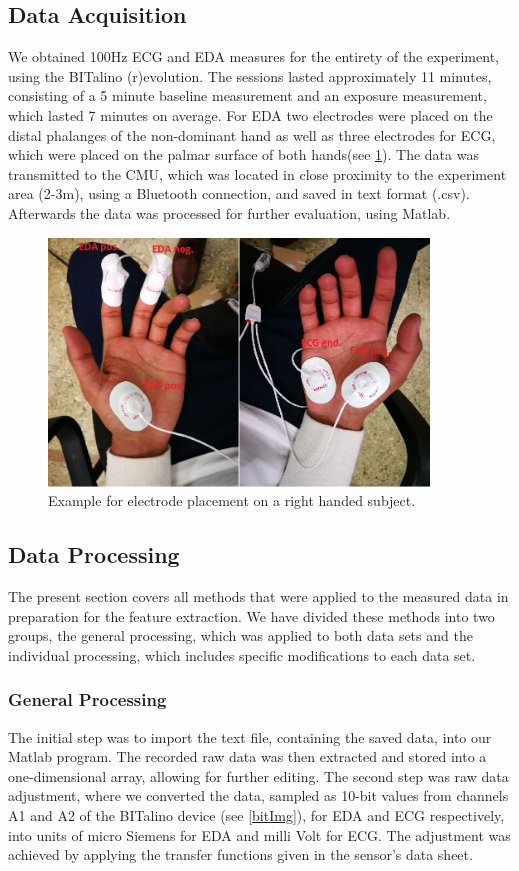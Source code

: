 \subsection{Data Acquisition}
We obtained 100Hz ECG and EDA measures for the entirety of the experiment, using the BITalino (r)evolution. The sessions lasted approximately 11 minutes, consisting of a 5 minute baseline measurement and an exposure measurement, which lasted 7 minutes on average. For EDA two electrodes were placed on the distal phalanges of the non-dominant hand as well as three electrodes for ECG, which were placed on the palmar surface of both hands(see \ref{epImg}). The data was transmitted to the CMU, which was located in close proximity to the experiment area (2-3m), using a Bluetooth connection, and saved in text format (.csv). Afterwards the data was processed for further evaluation, using Matlab.

\begin{figure}[H]
\centering
\includegraphics[width=0.9\textwidth]{images/ep.png}
\caption{Example for electrode placement on a right handed subject.}
\label{epImg}
\end{figure}

\subsection{Data Processing}
The present section covers all methods that were applied to the measured data in preparation for the feature extraction. We have divided these methods into two groups, the general processing, which was applied to both data sets and the individual processing, which includes specific modifications to each data set.

\subsubsection{General Processing}\label{generalproc}
The initial step was to import the text file, containing the saved data, into our Matlab program. The recorded raw data was then extracted and stored into a one-dimensional array, allowing for further editing. 
The second step was raw data adjustment, where we converted the data, sampled as 10-bit values from channels A1 and A2 of the BITalino device (see \ref{bitImg}), for EDA and ECG respectively, into units of micro Siemens for EDA and milli Volt for ECG. The adjustment was achieved by applying the transfer functions given in the sensor's data sheet.

